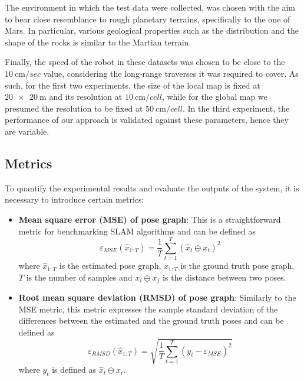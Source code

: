 The environment in which the test data were collected, was chosen with
the aim to bear close resemblance to rough planetary terrains,
specifically to the one of Mars.
In particular, various geological properties such as the distribution
and the shape of the rocks is similar to the Martian terrain.

Finally, the speed of the robot in these datasets was chosen to be close
to the $\SI{10}{\cm \per sec}$ value, considering the long-range traverses it was
required to cover.
As such, for the first two experiments, the size of the local map is fixed at
$\SI{20 x 20}{\m}$ and its resolution at $\SI{10}{\cm \per cell}$,
while for the global map we presumed the resolution to be fixed at
$\SI{50}{\cm \per cell}$.
In the third experiment, the performance of our approach is validated against
these parameters, hence they are variable.

\subsection{Metrics} \label{metrics}

To quantify the experimental results and evaluate the outputs of the system,
it is necessary to introduce certain metrics:
\begin{itemize}
    \item \textbf{Mean square error (MSE) of pose graph}:
        This is a straightforward metric for benchmarking SLAM algorithms
        \parencite{Kummerle2009}
        and can be defined as
        \begin{equation}
            \varepsilon_{MSE} (\hat{x}_{1:T}) = \frac{1}{T}
            \sum\limits_{t=1}^T (\hat{x}_t \ominus x_t)^2
        \end{equation}
        where
        $\hat{x}_{1:T}$ is the estimated pose graph,
        $x_{1:T}$ is the ground truth pose graph,
        $T$ is the number of samples and
        $x_i \ominus x_j$ is the distance between two poses.

    \item \textbf{Root mean square deviation (RMSD) of pose graph}:
        Similarly to the MSE metric, this metric expresses the sample
        standard deviation of the differences between the estimated and the
        ground truth poses and can be defined as
        \begin{equation}
            \varepsilon_{RMSD} (\hat{x}_{1:T}) = \sqrt{\frac{1}{T}
            \sum\limits_{t=1}^T (y_t - \varepsilon_{MSE})^2}
        \end{equation}
        where $y_t$ is defined as $\hat{x}_t \ominus x_t$.
\end{itemize}

